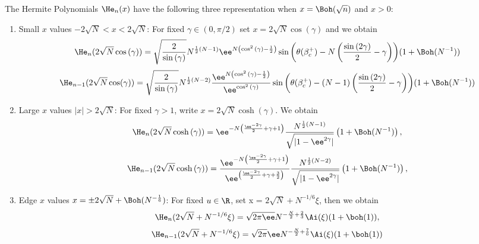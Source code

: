 \begin{thm}
The Hermite Polynomials $\He_n(x)$ have the following three representation when $x = \Boh(\sqrt{n})$ and $x > 0$:
\begin{enumerate}
	\item Small $x$ values $-2\sqrt{N} < x < 2\sqrt{N}$: For fixed $\gamma \in (0, \pi/2)$ set $x = 2\sqrt{N} \cos{(\gamma)}$ and we obtain
	 \begin{equation}
		\He_n(2\sqrt{N}\cos{(\gamma)}) = \sqrt{\frac{2}{\sin{(\gamma)}}}
		N^{\frac{1}{2} \left(N - 1\right)}
		\ee^{N\left(\cos^2{(\gamma)} - \frac{1}{2} \right)} 
		\sin{
			\left(
			\theta(\beta_c^+) 
			-N\left(\frac{\sin{(2\gamma)}}{2}
			-\gamma\right)
			\right)
		} 
		(1 + \Boh(N^{-1}))
		\label{Eq: Hermite small asymptotic (n)}
	\end{equation}
	\begin{equation}
		\He_{n-1}(2\sqrt{N}\cos(\gamma)) = \sqrt{\frac{2}{\sin{(\gamma)}}}
		N^{\frac{1}{2} \left(N -2\right)}
		\frac{\ee^{N\left(\cos^2{(\gamma)} - \frac{1}{2} \right)}}{\ee^{\cos^2{(\gamma)}}}
		\sin{
			\left(
			\theta(\beta_c^+) 
			-(N-1)\left(\frac{\sin{(2\gamma)}}{2}
			-\gamma\right)
			\right)
		} 
		(1 + \Boh(N^{-1}))
		\label{Eq: Hermite small asymptotic (n-1)}
	\end{equation}
	\item Large $x$ values $|x| > 2\sqrt{N}$: For fixed $\gamma > 1$, write $x = 2\sqrt{N} \cosh{(\gamma)}$. We obtain
	\begin{equation}
		\He_n(2\sqrt{N}\cosh{(\gamma)}) = \ee^{-N\left( \frac{\ee^{-2\gamma}}{2} + \gamma +  1\right)} \frac{N^{\frac{1}{2}\left(N - 1\right)}}{\sqrt{|1 - \ee^{2\gamma}|}} 
		\left(1 + \Boh(N^{-1}) \right),
		\label{Eq: Hermite large asymptotic (n)}
	\end{equation}
	\begin{equation}
		\He_{n-1}(2\sqrt{N}\cosh{(\gamma)}) = \frac{\ee^{-N\left( \frac{\ee^{-2\gamma}}{2} + \gamma +  1\right)}}{\ee^{\left( \frac{\ee^{-2\gamma}}{2} + \gamma + \frac{3}{2}\right)}} \frac{N^{\frac{1}{2}\left(N -2\right)}}{\sqrt{|1 - \ee^{2\gamma}|}} \left(1 + \Boh(N^{-1}) \right),
		\label{Eq: Hermite large asymptotic (n-1)}
	\end{equation}
	\item Edge $x$ values $x = \pm 2\sqrt{N} + \Boh(N^{-\frac{1}{6}})$: For fixed $u \in \R$, set x = $2\sqrt{N} + N^{-1/6}\xi$, then we obtain
	\begin{equation}
		\He_n(2\sqrt{N} + N^{-1/6}\xi) = \sqrt{2\pi\ee} N^{-\frac{N}{2} + \frac{2}{3}}  \Ai(\xi) (1 + \boh(1)),
		\label{Eq: Hermite edge asymptotic (n)}
	\end{equation}
		\begin{equation}
		\He_{n-1}(2\sqrt{N} + N^{-1/6}\xi) = \sqrt{2\pi} \ee N^{-\frac{N}{2} + \frac{7}{6}}  \Ai(\xi) (1 + \boh(1))
		\label{Eq: Hermite edge asymptotic (n-1)}
	\end{equation}
\end{enumerate}
\end{thm}

